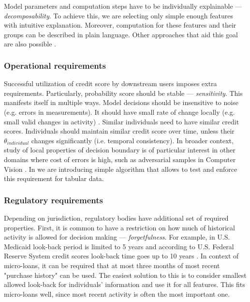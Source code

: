 \documentclass{article}
\begin{document}
Model parameters and computation steps have to be individually explainable --- \textit{decomposability}. To achieve this, we are selecting only simple enough features with intuitive explanation. Moreover, computation for these features and their groups can be described in plain language. Other approaches that aid this goal are also possible \cite{credit-interpret-copy}.

\subsubsection{Operational requirements}
Successful utilization of credit score by downstream users imposes extra requirements. Particularly, probability score should be stable --- \textit{sensitivity}. This manifests itself in multiple ways. Model decisions should be insensitive to noise (e.g. errors in measurements). It should have small rate of change locally (e.g. small valid changes in activity) \cite{practical-comment}. Similar individuals need to have similar credit scores. Individuals should maintain similar credit score over time, unless their $\theta_{individual}$ changes significantly (i.e. temporal consistency). In broader context, study of local properties of decision boundary is of particular interest in other domains where cost of errors is high, such as adversarial samples in Computer Vision \cite{semi-adversarial}. In  we are introducing simple algorithm that allows to test and enforce this requirement for tabular data.

\subsubsection{Regulatory requirements}
Depending on jurisdiction, regulatory bodies have additional set of required properties. First, it is common to have a restriction on how much of historical activity is allowed for decision making --- \textit{forgetfulness}. For example, in U.S. Medicaid look-back period is limited to 5 years \cite{credit-us-medicaid} and according to U.S. Federal Reserve System credit scores look-back time goes up to 10 years \cite{credit-us-gudeline}. In context of micro-loans, it can be required that at most three months of most recent "purchase history" can be used. The easiest solution to this is to consider smallest allowed look-back for individuals’ information and use it for all features. This fits micro-loans well, since most recent activity is often the most important one.
\end{document}
